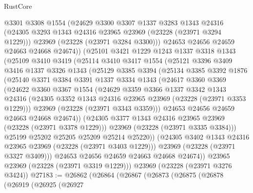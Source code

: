 \begin{lexlean}{RustCore}
\begin{coremodule}
        @3301
        @3308
        @1554
        (@24629
          @3300
          @3307
          @1337
          @3283
          @1343
          @24316
          (@24305 @3293 @1343 @24316 @23965 @23969 (@23228 (@23971 @3294 @1229)))
          @23969
          (@23228 (@23971 @3284 @3300)))
        @24653
        @24656
        @24659
        @24663
        @24668
        @24674))
    (@25101
      @3421
      @1229
      @1243
      @1337
      @3318
      @1343
      (@25109
        @3410
        @3419
        (@25114
          @3410
          @3417
          @1554
          (@25121
            @3396
            @3409
            @3416
            @1337
            @3326
            @1343
            (@25129
              @3385
              @3394
              (@25134
                @3385
                @3392
                @1876
                (@25140
                  @3371
                  @3384
                  @3391
                  @1337
                  @3334
                  @1343
                  (@24617
                    @3360
                    @3369
                    (@24622
                      @3360
                      @3367
                      @1554
                      (@24629
                        @3359
                        @3366
                        @1337
                        @3342
                        @1343
                        @24316
                        (@24305 @3352 @1343 @24316 @23965 @23969 (@23228 (@23971 @3353 @1229)))
                        @23969
                        (@23228 (@23971 @3343 @3359)))
                      @24653
                      @24656
                      @24659
                      @24663
                      @24668
                      @24674))
                  (@24305 @3377 @1343 @24316 @23965 @23969 (@23228 (@23971 @3378 @1229)))
                  @23969
                  (@23228 (@23971 @3335 @3384)))
                @25199
                @25202
                @25205
                @25209
                @25214
                @25220))
            (@24305 @3402 @1343 @24316 @23965 @23969 (@23228 (@23971 @3403 @1229)))
            @23969
            (@23228 (@23971 @3327 @3409)))
          @24653
          @24656
          @24659
          @24663
          @24668
          @24674))
      @23965
      @23969
      (@23228 (@23971 @3319 @1229)))
    @23969
    (@23228 (@23971 @3276 @3424))
@27183 := @26862
    (@26864
      (@26867
        (@26873
          (@26875
            (@26878
              (@26919
                (@26925
                  (@26927

\end{coremodule}
\end{lexlean}
